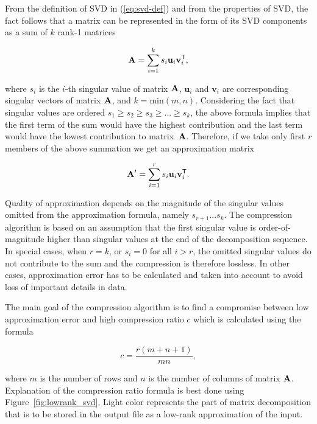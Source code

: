 From the definition of SVD in (\ref{eq:svd-def}) and from the properties of SVD, the fact follows that a matrix can be represented in the form of its SVD components as a sum of $k$ rank-1 matrices

\begin{equation}
\mathbf{A}=\sum_{i=1}^{k} s_{i}\mathbf{u}_{i}\mathbf{v}_{i}^{\mathsf{T}},
\label{eq:svd-expansion}
\end{equation}

\noindent
where $s_i$ is the $i$-th singular value of matrix $\mathbf{A}$, $\mathbf{u}_i$ and $\mathbf{v}_i$ are corresponding singular vectors of matrix $\mathbf{A}$, and $k = \mathrm{min}(m, n)$. Considering the fact that singular values are ordered $s_{1} \geq s_{2} \geq s_{3} \geq ... \geq s_{k}$, the above formula implies that the first term of the sum would have the highest contribution and the last term would have the lowest contribution to matrix~$\mathbf{A}$. Therefore, if we take only first $r$ members of the above summation we get an approximation matrix

\begin{equation}
\mathbf{A'}=\sum_{i=1}^{r} s_{i}\mathbf{u}_{i}\mathbf{v}_{i}^{\mathsf{T}}.
\label{eq:svd-approx-expansion}
\end{equation}

Quality of approximation depends on the magnitude of the singular values omitted from the approximation formula, namely $s_{r+1} ...  s_{k}$. The compression algorithm is based on an assumption that the first singular value is order-of-magnitude higher than singular values at the end of the decomposition sequence. In special cases, when $r=k$, or $s_{i}=0$ for all $i > r$, the omitted singular values do not contribute to the sum and the compression is therefore lossless. In other cases, approximation error has to be calculated and taken into account to avoid loss of important details in data.

The main goal of the compression algorithm is to find a compromise between low approximation error and high compression ratio $c$ which is calculated using the formula

\begin{equation}
c=\frac{r(m+n+1)}{m n},
\label{eq:cr-def}
\end{equation}

\noindent
where $m$ is the number of rows and $n$ is the number of columns of matrix $\mathbf{A}$. Explanation of the compression ratio formula is best done using Figure~\ref{fig:lowrank_svd}. Light color represents the part of matrix decomposition that is to be stored in the output file as a low-rank approximation of the input.

